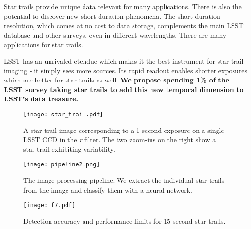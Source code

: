 \documentclass[12pt, letterpaper]{article}
\begin{document}
Star trails provide unique data relevant for many applications. There is also the potential to discover new short duration phenomena. The short duration resolution, which comes at no cost to data storage, complements the main LSST database and other surveys, even in different wavelengths. There are many applications for star trails. 

LSST has an unrivaled etendue which makes it the best instrument for star trail imaging - it simply sees more sources. Its rapid readout enables shorter exposures which are better for star trails as well. \textbf{We propose spending 1\% of the LSST survey taking star trails to add this new temporal dimension to LSST's data treasure.}

\begin{figure*}[htb]
\center
\texttt{[image: star\_trail.pdf]}
\caption{A star trail image corresponding to a 1 second exposure on a single LSST CCD in the \textit{r} filter. The two zoom-ins on the right show a star trail exhibiting variability.}
\label{fig:trail}
\end{figure*}

\begin{figure*}[htb!]
\center
\texttt{[image: pipeline2.png]}
\caption{The image processing pipeline. We extract the individual star trails from the image and classify them with a neural network.}
\label{fig:pipeline}
\end{figure*}

\begin{figure*}[htb!]
\center
\texttt{[image: f7.pdf]}
\caption{Detection accuracy and performance limits for 15 second star trails.}
\label{fig:longlimit}
\end{figure*}

\end{document}
